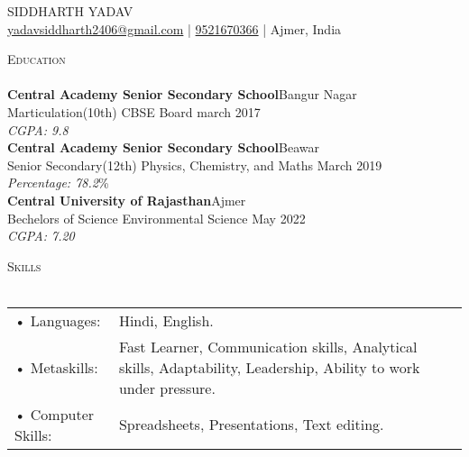 \documentclass[a4paper]{article}
\newcommand{\lineunder} {
    \vspace*{-8pt} \\
    \hspace*{-18pt} \hrulefill \\
}
\newcommand{\header} [1] {
    {\hspace*{-18pt}\vspace*{6pt} \textsc{#1}}
    \vspace*{-6pt} \lineunder
}
\begin{document}
    \vspace*{-40pt}

    

%
%
  \vspace*{-2pt}
  \begin{center}
    {\Huge \scshape {SIDDHARTH YADAV}}\\
    \vspace*{2pt}
    \vspace*{2pt}
    \href{mailto:yadavsiddharth2406@gmail.com}{yadavsiddharth2406@gmail.com} | \href{tel:9521670366}{9521670366} | Ajmer, India\\
    \vspace*{2pt}
    
  \end{center}



      \header{Education}
      \vspace{2mm}
      \textbf{Central Academy Senior Secondary School}\hfill Bangur Nagar\\
Marticulation(10th) CBSE Board \hfill march 2017\\
{\sl CGPA: 9.8}\\
\vspace{2mm}
      \textbf{Central Academy Senior Secondary School}\hfill Beawar\\
Senior Secondary(12th) Physics, Chemistry, and Maths \hfill March 2019\\
{\sl Percentage: 78.2}\%\\
\vspace{2mm}
      \textbf{Central University of Rajasthan}\hfill Ajmer\\
Bechelors of Science Environmental Science \hfill May 2022\\
{\sl CGPA: 7.20}\\
\vspace{2mm}



%
%
  \header{Skills}
  \vspace{2mm}
  \begin{longtable}{p{4cm}p{12cm}}
  • Languages: & Hindi, English. \\
  • Metaskills: & Fast Learner, Communication skills, Analytical skills, Adaptability, Leadership, Ability to work under pressure.\\
  • Computer Skills: & Spreadsheets, Presentations, Text editing.\\
  \end{longtable}
  \vspace{1mm}
\end{document}

